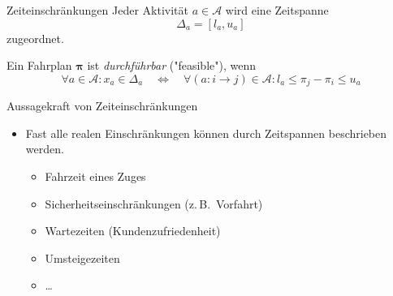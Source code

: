 \documentclass[accentcolor = tud11b, colorbacktitle, landscape, german, presentation]{tudbeamer}
\renewcommand{\vec}[1]{\boldsymbol{\mathbf{#1}}}
\newcommand{\zB}{z.\,B.~}
\begin{document}
		\begin{frame}{Zeiteinschränkungen}
			Jeder Aktivität \( a \in \mathcal{A} \) wird eine Zeitspanne
			\begin{equation*}
				\Delta_a = [l_a, u_a]
			\end{equation*}
			zugeordnet.
			
			Ein Fahrplan \(\vec{\pi}\) ist \emph{durchführbar} ("feasible"), wenn
			\begin{equation*}
				\forall a \in \mathcal{A} : x_a \in \Delta_a \quad\iff\quad \forall (a : i \to j) \in \mathcal{A} : l_a \leq \pi_j - \pi_i \leq u_a
			\end{equation*}
		\end{frame}
	
		\begin{frame}{Aussagekraft von Zeiteinschränkungen}
			\begin{itemize}
				\item Fast alle realen Einschränkungen können durch Zeitspannen beschrieben werden.
				\begin{itemize}
					\item<2-> Fahrzeit eines Zuges
					\item<2-> Sicherheitseinschränkungen (\zB Vorfahrt)
					\item<2-> Wartezeiten (Kundenzufriedenheit)
					\item<2-> Umsteigezeiten
					\item<2-> \dots
				\end{itemize}
			\end{itemize}
		\end{frame}
	
\end{document}
